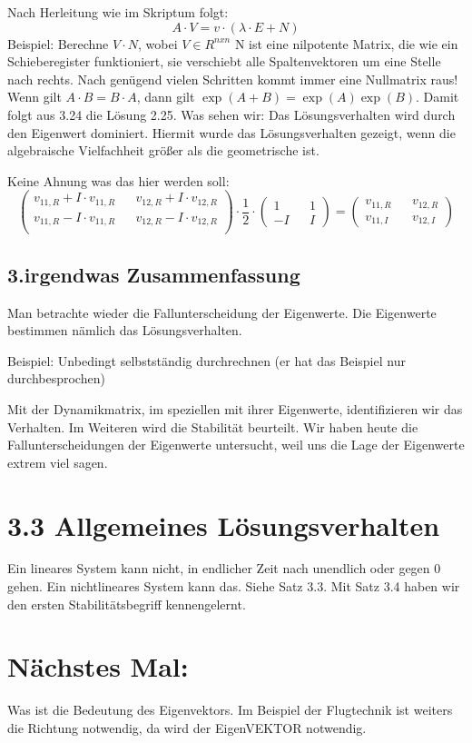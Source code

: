 \documentclass[a4paper]{article}
\begin{document}
Nach Herleitung wie im Skriptum folgt:
\[A\cdot V=v\cdot (\lambda\cdot E+N)\]
 Beispiel:  Berechne $V\cdot N$, wobei $V \in R^{n x n}$
N ist eine nilpotente Matrix, die wie ein Schieberegister funktioniert, sie verschiebt alle Spaltenvektoren um eine Stelle nach rechts. Nach genügend vielen Schritten kommt immer eine Nullmatrix raus!
\newline
Wenn gilt $A\cdot B=B\cdot A$, dann gilt $\exp(A+B)=\exp(A)\exp(B)$. Damit folgt aus 3.24 die Lösung 2.25.
Was sehen wir: Das Lösungsverhalten wird durch den Eigenwert dominiert. Hiermit wurde das Lösungsverhalten gezeigt, wenn die algebraische Vielfachheit größer als die geometrische ist.

Keine Ahnung was das hier werden soll:
 \[
\begin{pmatrix}
    v_{11,R}+I\cdot v_{11,R} && v_{12,R}+I\cdot v_{12,R}\\
v_{11,R}-I\cdot v_{11,R} && v_{12,R}-I\cdot v_{12,R}\\
\end{pmatrix}  
\cdot \frac{1}{2}\cdot
\begin{pmatrix}
1 && 1\\
-I && I
\end{pmatrix} =
\begin{pmatrix}
v_{11,R} && v_{12,R}\\
v_{11,I} && v_{12,I}
\end{pmatrix} 
\]

 \subsection*{3.irgendwas Zusammenfassung}
 Man betrachte wieder die Fallunterscheidung der Eigenwerte. Die Eigenwerte bestimmen nämlich das Lösungsverhalten.\newline

Beispiel: Unbedingt selbstständig durchrechnen (er hat das Beispiel nur durchbesprochen)

Mit der Dynamikmatrix, im speziellen mit ihrer Eigenwerte, identifizieren wir das Verhalten. Im Weiteren wird die Stabilität beurteilt. Wir haben heute die Fallunterscheidungen der Eigenwerte untersucht, weil uns die Lage der Eigenwerte extrem viel sagen.
\section*{3.3 Allgemeines Lösungsverhalten}
Ein lineares System kann nicht, in endlicher Zeit nach unendlich oder gegen 0 gehen. Ein nichtlineares System kann das. Siehe Satz 3.3. Mit Satz 3.4 haben wir den ersten Stabilitätsbegriff kennengelernt.

\section*{Nächstes Mal:}
Was ist die Bedeutung des Eigenvektors. Im Beispiel der Flugtechnik ist weiters die Richtung notwendig, da wird der EigenVEKTOR notwendig.
\end{document}
